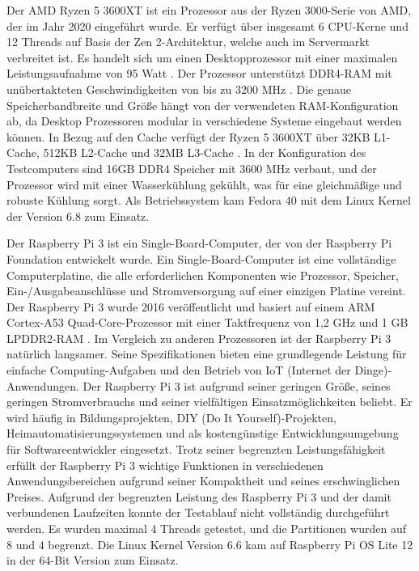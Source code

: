 Der AMD Ryzen 5 3600XT ist ein Prozessor aus der Ryzen 3000-Serie von AMD, der im Jahr 2020 eingeführt wurde. Er verfügt über insgesamt 6 CPU-Kerne und 12 Threads auf Basis der Zen 2-Architektur, welche auch im Servermarkt verbreitet ist. Es handelt sich um einen Desktopprozessor mit einer maximalen Leistungsaufnahme von 95 Watt \citep{Ryzen_Technische_Daten}.
Der Prozessor unterstützt DDR4-RAM mit unübertakteten Geschwindigkeiten von bis zu 3200 MHz \citep{Ryzen_Technische_Daten}. Die genaue Speicherbandbreite und Größe hängt von der verwendeten RAM-Konfiguration ab, da Desktop Prozessoren modular in verschiedene Systeme eingebaut werden können.
In Bezug auf den Cache verfügt der Ryzen 5 3600XT über 32KB L1-Cache, 512KB L2-Cache und 32MB L3-Cache \citep{Ryzen_Technische_Daten}. In der Konfiguration des Testcomputers sind 16GB DDR4 Speicher mit 3600 MHz verbaut, und der Prozessor wird mit einer Wasserkühlung gekühlt, was für eine gleichmäßige und robuste Kühlung sorgt. Als Betriebssystem kam Fedora 40 mit dem Linux Kernel der Version 6.8 zum Einsatz.

Der Raspberry Pi 3 ist ein Single-Board-Computer, der von der Raspberry Pi Foundation entwickelt wurde. Ein Single-Board-Computer ist eine vollständige Computerplatine, die alle erforderlichen Komponenten wie Prozessor, Speicher, Ein-/Ausgabeanschlüsse und Stromversorgung auf einer einzigen Platine vereint. Der Raspberry Pi 3 wurde 2016 veröffentlicht und basiert auf einem ARM Cortex-A53 Quad-Core-Prozessor mit einer Taktfrequenz von 1,2 GHz und 1 GB LPDDR2-RAM \citep{RaspberryPi_Technische_Daten}.
Im Vergleich zu anderen Prozessoren ist der Raspberry Pi 3 natürlich langsamer. Seine Spezifikationen bieten eine grundlegende Leistung für einfache Computing-Aufgaben und den Betrieb von IoT (Internet der Dinge)-Anwendungen.
Der Raspberry Pi 3 ist aufgrund seiner geringen Größe, seines geringen Stromverbrauchs und seiner vielfältigen Einsatzmöglichkeiten beliebt. Er wird häufig in Bildungsprojekten, DIY (Do It Yourself)-Projekten, Heimautomatisierungssystemen und als kostengünstige Entwicklungsumgebung für Softwareentwickler eingesetzt. Trotz seiner begrenzten Leistungsfähigkeit erfüllt der Raspberry Pi 3 wichtige Funktionen in verschiedenen Anwendungsbereichen aufgrund seiner Kompaktheit und seines erschwinglichen Preises.
Aufgrund der begrenzten Leistung des Raspberry Pi 3 und der damit verbundenen Laufzeiten konnte der Testablauf nicht vollständig durchgeführt werden. Es wurden maximal 4 Threads getestet, und die Partitionen wurden auf 8 und 4 begrenzt. Die Linux Kernel Version 6.6 kam auf Raspberry Pi OS Lite 12 in der 64-Bit Version zum Einsatz.

